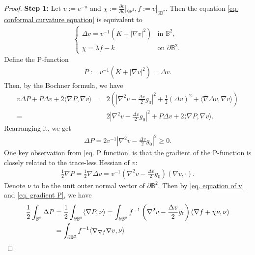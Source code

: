 \documentclass[11pt,a4paper,twoside]{amsart}
\newtheorem{sketch proof}{Sketch of the proof}[section]
\begin{document}
\begin{proof}
    {\bf Step 1:}
    Let $v:=e^{-u}$ and $\chi:=\frac{\partial v}{\partial\nu}|_{\partial\mathbb{B}^2}, f:=v|_{\partial\mathbb{B}^2}$. Then the equation \cref{eq. conformal curvature equation} is equivalent to 
\begin{align}\label{eq. equation of v}
\begin{cases}
    \Delta v=v^{-1}(K+|\nabla v|^2) &\text{in }\mathbb{B}^2,\\[2mm]
        \chi=\lambda f-k &\text{on }\partial\mathbb{B}^2.
\end{cases}
\end{align}
Define the P-function
\begin{align}\label{eq. P function}
    P:=v^{-1}(K+|\nabla v|^2)=\Delta v.
\end{align}
Then, by the Bochner formula, we have
    \begin{align*}
        v\Delta P+P\Delta v+2\langle\nabla P,\nabla v\rangle
        =&2\left(
        \left|\nabla^2v-\frac{\Delta v}{2}g_0\right|^2
        +\frac{1}{2}(\Delta v)^2
        +\langle\nabla\Delta v,\nabla v\rangle
        \right)\\
        =&2\left|\nabla^2v-\frac{\Delta v}{2}g_0\right|^2
        +P\Delta v+2\langle\nabla P,\nabla v\rangle.
    \end{align*}
    Rearranging it, we get
\begin{align}\label{eq. Delta P}
    \Delta P=2v^{-1}
    \left|\nabla^2 v-\frac{\Delta v}{2}g_0\right|^2\geq 0.
\end{align}
One key observation from \cref{eq. P function} is that the gradient of the P-function is closely related to the trace-less Hessian of $v$:
\begin{align}\label{eq. gradient P}
    \frac{1}{2}\nabla P
    =\frac{1}{2}\nabla\Delta v
    =v^{-1}
    \left(
    \nabla^2 v-\frac{\Delta v}{2}g_0
    \right)(\nabla v,\cdot).
\end{align}
Denote  $\nu$ to be the unit outer normal vector of $\partial \mathbb{B}^2$. Then by \cref{eq. equation of v} and \cref{eq. gradient P}, we have
\begin{align}
    \frac{1}{2}\int_{\mathbb{B}^2}\Delta P
    &= \frac{1}{2}\int_{\partial\mathbb{B}^2}
    \langle\nabla P,\nu\rangle
    =\int_{\partial\mathbb{B}^2}
    f^{-1}\left(
    \nabla^2 v-\frac{\Delta v}{2}g_0
    \right)(\nabla f+\chi\nu,\nu)\notag\\
    &= \int_{\partial\mathbb{B}^2}
    f^{-1}\langle\nabla_{\nabla f}\nabla v,\nu\rangle

\end{align}
\end{proof}
\end{document}
